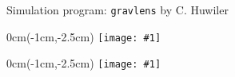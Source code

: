 \documentclass{beamer}
\newcommand{\imgframe}[1]{%
  \begin{frame}%
	\begin{textblock*}{0cm}(-1cm,-2.5cm)%
      \texttt{[image: \#1]}%
	\end{textblock*}%
  \end{frame}%
}
\begin{document}
\begin{frame}
	\footnotesize{Simulation program: \texttt{gravlens} by C. Huwiler}
	
\end{frame}





\imgframe{imgs/fig0}
\imgframe{imgs/fig3}
\end{document}
